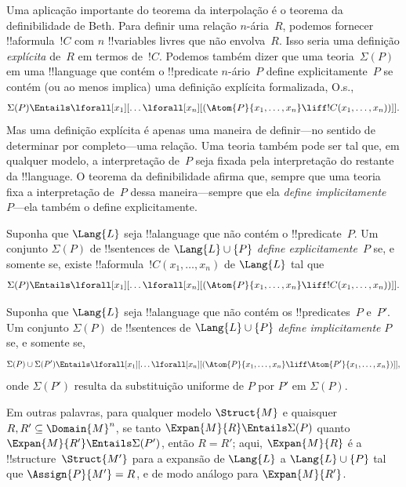 \documentclass[../../../include/open-logic-section]{subfiles}
\begin{document}


Uma aplicação importante do teorema da interpolação é o teorema da
definibilidade de Beth. Para definir uma relação $n$-ária~$R$, podemos
fornecer !!a{formula}~$!C$ com $n$ !!{variable}s livres que não
envolva~$R$. Isso seria uma definição \emph{explícita} de~$R$ em termos
de~$!C$. Podemos também dizer que uma teoria~$\Sigma(P)$ em uma
!!{language} que contém o !!{predicate} $n$-ário~$P$ define
explicitamente~$P$ se contém (ou ao menos implica) uma definição
explícita formalizada, O.s.\@,
\[
\Sigma(P) \Entails \lforall[x_1][\dots
  \lforall[x_n][(\Atom{P}{x_1,\dots, x_n} \liff !C(x_1, \dots,
    x_n))]].
\]
Mas uma definição explícita é apenas uma maneira de definir---no
sentido de determinar por completo---uma relação. Uma teoria também
pode ser tal que, em qualquer modelo, a interpretação de~$P$ seja
fixada pela interpretação do restante da !!{language}. O teorema da
definibilidade afirma que, sempre que uma teoria fixa a interpretação
de~$P$ dessa maneira---sempre que ela \emph{define implicitamente}
~$P$---ela também o define explicitamente.

\begin{defn}
Suponha que $\Lang{L}$ seja !!a{language} que não contém o
!!{predicate}~$P$. Um conjunto $\Sigma(P)$ de !!{sentence}s de
$\Lang{L} \cup \{P\}$ \emph{define explicitamente}~$P$ se, e somente
se, existe !!a{formula}~$!C(x_1, \dots, x_n)$ de $\Lang{L}$ tal que
\[
\Sigma(P) \Entails \lforall[x_1][\dots
  \lforall[x_n][(\Atom{P}{x_1,\dots, x_n} \liff !C(x_1, \dots,
    x_n))]].
\]
\end{defn}

\begin{defn}
Suponha que $\Lang{L}$ seja !!a{language} que não contém os
!!{predicate}s~$P$ e~$P'$. Um conjunto $\Sigma(P)$ de !!{sentence}s de
$\Lang{L} \cup \{P\}$ \emph{define implicitamente} $P$ se, e somente
se,
\[
\Sigma(P) \cup \Sigma(P') \Entails \lforall[x_1][\dots
  \lforall[x_n][(\Atom{P}{x_1,\dots, x_n} \liff \Atom{P'}{x_1,\dots,
      x_n})]],
\]
onde $\Sigma(P')$ resulta da substituição uniforme de $P$ por $P'$ em
$\Sigma(P)$.
\end{defn}

Em outras palavras, para qualquer modelo $\Struct{M}$ e quaisquer
$R, R' \subseteq \Domain{M}^n$, se tanto
$\Expan{M}{R} \Entails \Sigma(P)$ quanto
$\Expan{M}{R'} \Entails \Sigma(P')$, então $R=R'$; aqui,
$\Expan{M}{R}$ é a !!{structure}~$\Struct{M'}$ para a expansão de
$\Lang{L}$ a $\Lang{L} \cup \{P\}$ tal que $\Assign{P}{M'} = R$, e de
modo análogo para $\Expan{M}{R'}$.
\end{document}
